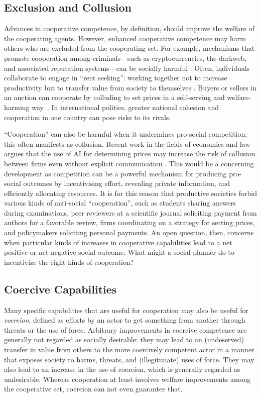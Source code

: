 \documentclass[11pt, a4paper, logo, onecolumn, nonumbering]{deepmind}
\begin{document}
\subsection{Exclusion and Collusion}
Advances in cooperative competence, by definition, should improve the welfare of the cooperating agents. However, enhanced cooperative competence may harm others who are excluded from the cooperating set. For example, mechanisms that promote cooperation among %
criminals---such as cryptocurrencies, the darkweb, and associated reputation systems---can be socially harmful \cite{10.1093/esr/jcx072}. %
Often, individuals collaborate to engage in ``rent seeking'': working together not to increase productivity but to transfer value from society to themselves \cite{10.2307/2117699,10.2307/j.ctt1nprdd}. Buyers or sellers in an auction can cooperate by colluding to set prices in a self-serving and welfare-harming way~\cite{Pesendorfer2000ASO}. %
In international politics, greater national cohesion and cooperation in one country can pose risks to its rivals. 








``Cooperation'' can also be harmful when it undermines pro-social competition; this often manifests as collusion. Recent work in the fields of economics and law argues that the use of AI for determining prices may increase the risk of collusion between firms even without explicit communication \cite{calvano2020artificial,ezrachi2017artificial}. This would be a concerning development as competition can be a powerful mechanism for producing pro-social outcomes by incentivising effort, revealing private information, and efficiently allocating resources. It is for this reason that productive societies  forbid various kinds of anti-social ``cooperation'', such as students sharing answers during examinations, peer reviewers at a scientific journal soliciting payment from authors for a favorable review, firms coordinating on a strategy for setting prices, and policymakers soliciting personal payments.   
An open question, then, %
concerns when particular kinds of increases in cooperative capabilities lead to a net positive or net negative social outcome. What might a social planner do to incentivize the right kinds of cooperation? 


\subsection{Coercive Capabilities}
Many specific capabilities that are useful for cooperation may also be useful for \textit{coercion}, defined as efforts by an actor to get something from another through threats or the use of force. %
Arbitrary improvements in coercive competence are generally not regarded as socially desirable: they may lead to an (undeserved) transfer in value from others to the more coercively competent actor in a manner that exposes society to harms, threats, and (illegitimate) uses of force. They may also lead to an increase in the use of coercion, which is generally regarded as undesirable. Whereas cooperation at least involves welfare improvements among the cooperative set, coercion can not even guarantee that.
\end{document}
